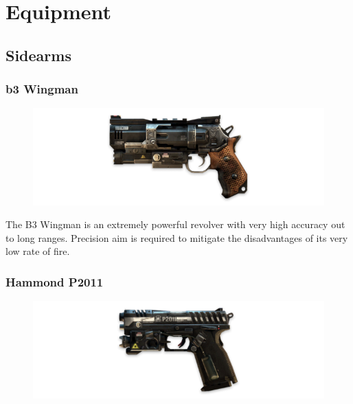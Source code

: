 \documentclass[9pt, openany]{extbook}
\begin{document}


\chapter{Equipment}
\label{chap:equip}


\section{Sidearms}
\label{sec:sidearms}

\subsection{b3 Wingman}

\begin{figure}
\vspace*{-2em}
\includegraphics[width=\linewidth]{B3wingman}
\end{figure}

The B3 Wingman is an extremely powerful revolver with very high accuracy out to long ranges. Precision aim is required to mitigate the disadvantages of its very low rate of fire. 

\subsection{Hammond P2011}

\begin{figure}
\vspace*{-2em}
\includegraphics[width=\linewidth]{HammondP2011}
\end{figure}
\end{document}
